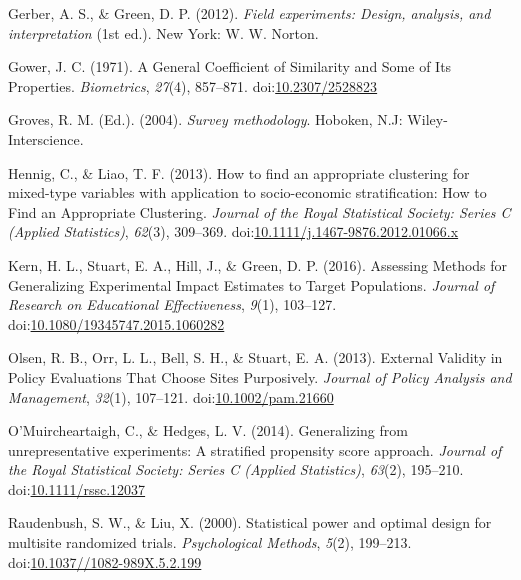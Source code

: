 \documentclass[man,floatsintext]{apa6}
\begin{document}
\leavevmode\hypertarget{ref-gerberFieldExperimentsDesign2012}{}%
Gerber, A. S., \& Green, D. P. (2012). \emph{Field experiments: Design, analysis, and interpretation} (1st ed.). New York: W. W. Norton.

\leavevmode\hypertarget{ref-gowerGeneralCoefficientSimilarity1971}{}%
Gower, J. C. (1971). A General Coefficient of Similarity and Some of Its Properties. \emph{Biometrics}, \emph{27}(4), 857--871. doi:\href{https://doi.org/10.2307/2528823}{10.2307/2528823}

\leavevmode\hypertarget{ref-grovesSurveyMethodology2004}{}%
Groves, R. M. (Ed.). (2004). \emph{Survey methodology}. Hoboken, N.J: Wiley-Interscience.

\leavevmode\hypertarget{ref-hennigHowFindAppropriate2013}{}%
Hennig, C., \& Liao, T. F. (2013). How to find an appropriate clustering for mixed-type variables with application to socio-economic stratification: How to Find an Appropriate Clustering. \emph{Journal of the Royal Statistical Society: Series C (Applied Statistics)}, \emph{62}(3), 309--369. doi:\href{https://doi.org/10.1111/j.1467-9876.2012.01066.x}{10.1111/j.1467-9876.2012.01066.x}

\leavevmode\hypertarget{ref-kernAssessingMethodsGeneralizing2016}{}%
Kern, H. L., Stuart, E. A., Hill, J., \& Green, D. P. (2016). Assessing Methods for Generalizing Experimental Impact Estimates to Target Populations. \emph{Journal of Research on Educational Effectiveness}, \emph{9}(1), 103--127. doi:\href{https://doi.org/10.1080/19345747.2015.1060282}{10.1080/19345747.2015.1060282}

\leavevmode\hypertarget{ref-olsenExternalValidityPolicy2013}{}%
Olsen, R. B., Orr, L. L., Bell, S. H., \& Stuart, E. A. (2013). External Validity in Policy Evaluations That Choose Sites Purposively. \emph{Journal of Policy Analysis and Management}, \emph{32}(1), 107--121. doi:\href{https://doi.org/10.1002/pam.21660}{10.1002/pam.21660}

\leavevmode\hypertarget{ref-omuircheartaighGeneralizingUnrepresentativeExperiments2014}{}%
O'Muircheartaigh, C., \& Hedges, L. V. (2014). Generalizing from unrepresentative experiments: A stratified propensity score approach. \emph{Journal of the Royal Statistical Society: Series C (Applied Statistics)}, \emph{63}(2), 195--210. doi:\href{https://doi.org/10.1111/rssc.12037}{10.1111/rssc.12037}

\leavevmode\hypertarget{ref-raudenbushStatisticalPowerOptimal2000}{}%
Raudenbush, S. W., \& Liu, X. (2000). Statistical power and optimal design for multisite randomized trials. \emph{Psychological Methods}, \emph{5}(2), 199--213. doi:\href{https://doi.org/10.1037//1082-989X.5.2.199}{10.1037//1082-989X.5.2.199}
\end{document}

